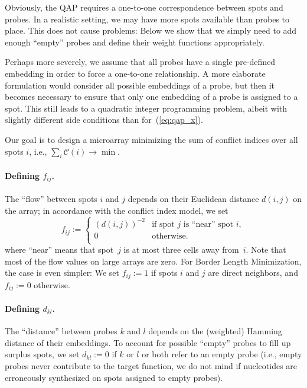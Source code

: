 \documentclass[english]{lni}
\begin{document}
Obviously, the QAP requires a one-to-one correspondence between spots and
probes. In a realistic setting, we may have more spots available than probes
to place. This does not cause problems: Below we show that we simply need to
add enough ``empty'' probes and define their weight functions appropriately.

Perhaps more severely, we assume that all probes have a single pre-defined
embedding in order to force a one-to-one relationship.  A more elaborate
formulation would consider all possible embeddings of a probe, but then it
becomes necessary to ensure that only one embedding of a probe is assigned to
a spot. This still leads to a quadratic integer programming problem, albeit
with slightly different side conditions than for~(\ref{eq:qap_x}).

Our goal is to design a microarray minimizing the sum of conflict indices over
all spots $i$, i.e., $\sum_{i} \mathcal{C}(i) \to \min$.


\paragraph{Defining $f_{ij}$.}
The ``flow'' between spots $i$ and $j$ depends on their Euclidean distance
$d(i,j)$ on the array; in accordance with the conflict index model, we set
\begin{equation}
  f_{ij} := \left\{ \begin{array}{ll}
      (d(i,j))^{-2} & \mbox{if spot $j$ is ``near'' spot $i$}, \\
      0 & \mbox{otherwise}. \\
    \end{array} \right.
\end{equation}
where ``near'' means that spot~$j$ is at most three cells away from~$i$. Note
that most of the flow values on large arrays are zero. For Border Length
Minimization, the case is even simpler: We set $f_{ij}:=1$ if spots $i$ and
$j$ are direct neighbors, and $f_{ij}:=0$ otherwise.

\paragraph{Defining $d_{kl}$.}
The ``distance'' between probes $k$ and $l$ depends on the (weighted) Hamming
distance of their embeddings. To account for possible ``empty'' probes to fill
up surplus spots, we set $d_{kl}:=0$ if $k$ or $l$ or both refer to an empty
probe (i.e., empty probes never contribute to the target function, we do not
mind if nucleotides are erroneously synthesized on spots assigned to empty
probes). 
\end{document}
